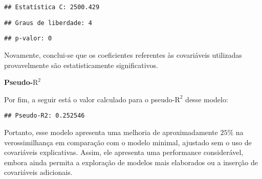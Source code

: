\documentclass[
]{article}
\begin{document}
\begin{verbatim}
## Estatística C: 2500.429
\end{verbatim}

\begin{verbatim}
## Graus de liberdade: 4
\end{verbatim}

\begin{verbatim}
## p-valor: 0
\end{verbatim}

Novamente, conclui-se que os coeficientes referentes às covariáveis
utilizadas provavelmente são estatisticamente significativos.

\textbf{Pseudo-\(\text{R}^2\)}

Por fim, a seguir está o valor calculado para o pseudo-\(\text{R}^2\)
desse modelo:

\begin{verbatim}
## Pseudo-R2: 0.252546
\end{verbatim}

Portanto, esse modelo apresenta uma melhoria de aproximadamente \(25\%\)
na verossimilhança em comparação com o modelo minimal, ajustado sem o
uso de covariáveis explicativas. Assim, ele apresenta uma performance
considerável, embora ainda permita a exploração de modelos mais
elaborados ou a inserção de covariáveis adicionais.
\end{document}
